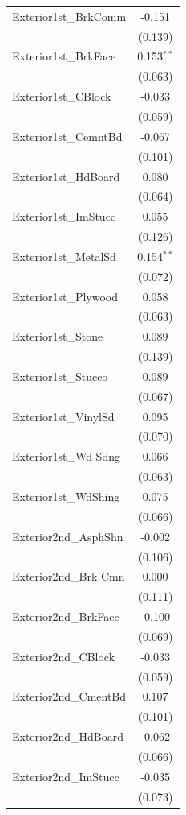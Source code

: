 \begin{table}[!htbp]
\begin{tabular}{@{\extracolsep{5pt}}lc}
 Exterior1st_BrkComm & -0.151$^{}$ \\
& (0.139) \\
 Exterior1st_BrkFace & 0.153$^{**}$ \\
& (0.063) \\
 Exterior1st_CBlock & -0.033$^{}$ \\
& (0.059) \\
 Exterior1st_CemntBd & -0.067$^{}$ \\
& (0.101) \\
 Exterior1st_HdBoard & 0.080$^{}$ \\
& (0.064) \\
 Exterior1st_ImStucc & 0.055$^{}$ \\
& (0.126) \\
 Exterior1st_MetalSd & 0.154$^{**}$ \\
& (0.072) \\
 Exterior1st_Plywood & 0.058$^{}$ \\
& (0.063) \\
 Exterior1st_Stone & 0.089$^{}$ \\
& (0.139) \\
 Exterior1st_Stucco & 0.089$^{}$ \\
& (0.067) \\
 Exterior1st_VinylSd & 0.095$^{}$ \\
& (0.070) \\
 Exterior1st_Wd Sdng & 0.066$^{}$ \\
& (0.063) \\
 Exterior1st_WdShing & 0.075$^{}$ \\
& (0.066) \\
 Exterior2nd_AsphShn & -0.002$^{}$ \\
& (0.106) \\
 Exterior2nd_Brk Cmn & 0.000$^{}$ \\
& (0.111) \\
 Exterior2nd_BrkFace & -0.100$^{}$ \\
& (0.069) \\
 Exterior2nd_CBlock & -0.033$^{}$ \\
& (0.059) \\
 Exterior2nd_CmentBd & 0.107$^{}$ \\
& (0.101) \\
 Exterior2nd_HdBoard & -0.062$^{}$ \\
& (0.066) \\
 Exterior2nd_ImStucc & -0.035$^{}$ \\
& (0.073) \\

\end{tabular}
\end{table}

